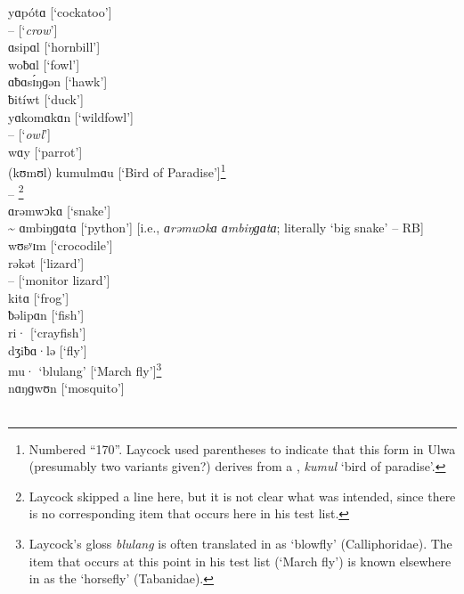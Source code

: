 \noindent yɑpótɑ     [‘cockatoo’]\\
 --        [‘\textit{crow}’]\\
ɑsipɑl       [‘hornbill’]\\
woƀɑl       [‘fowl’]\\
ɑƀɑsɪ́ŋɡən     [‘hawk’]\\
ƀitíwt       [‘duck’]\\
yɑkomɑkɑn   [‘wildfowl’]\\
 --        [‘\textit{owl}’]\\
wɑy       [‘parrot’]\\
(kʊmʊl) kumulmɑu  [‘Bird of Paradise’]\footnote{Numbered “170”. Laycock used parentheses to indicate that this form in Ulwa (presumably two variants given?) derives from a  , \textit{kumul} ‘bird of paradise’.}\\
 -- \footnote{Laycock skipped a line here, but it is not clear what was intended, since there is no corresponding item that occurs here in his test list.}\\
ɑrəmwɔkɑ   [‘snake’]\\
{\textasciitilde} ɑmbiŋɡɑtɑ   [‘python’] [i.e., \textit{ɑrəmwɔkɑ ɑmbiŋɡɑtɑ}; literally ‘big snake’ -- RB]\\
wʊsʸɪm     [‘crocodile’]\\
rəkət       [‘lizard’]\\
 --        [‘monitor lizard’]\\
kitɑ       [‘frog’]\\
ƀəlipɑn     [‘fish’]\\
ri·         [‘crayfish’]\\
dʒiƀɑ·lə    [‘fly’]\\
mu·      ‘blulang’ [‘March fly’]\footnote{Laycock’s  gloss \textit{blulang} is often translated in  as ‘blowfly’ (Calliphoridae). The item that occurs at this point in his test list (‘March fly’) is known elsewhere in  as the ‘horsefly’ (Tabanidae).}\\
nɑŋɡwʊn     [‘mosquito’]\\

\\

